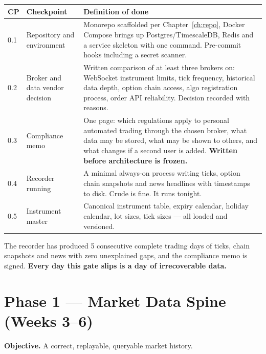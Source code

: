 \begin{longtable}{@{}p{1.4cm}p{6.0cm}p{7.0cm}@{}}
\toprule
\textbf{CP} & \textbf{Checkpoint} & \textbf{Definition of done}\\
\midrule
0.1 & Repository and environment & Monorepo scaffolded per Chapter~\ref{ch:repo},
Docker Compose brings up Postgres/TimescaleDB, Redis and a service skeleton with
one command. Pre-commit hooks including a secret scanner.\\
0.2 & Broker and data vendor decision & Written comparison of at least three
brokers on: WebSocket instrument limits, tick frequency, historical data depth,
option chain access, algo registration process, order API reliability. Decision
recorded with reasons.\\
0.3 & Compliance memo & One page: which regulations apply to personal automated
trading through the chosen broker, what data may be stored, what may be shown to
others, and what changes if a second user is added. \textbf{Written before
architecture is frozen.}\\
0.4 & Recorder running & A minimal always-on process writing ticks, option chain
snapshots and news headlines with timestamps to disk. Crude is fine. It runs
tonight.\\
0.5 & Instrument master & Canonical instrument table, expiry calendar, holiday
calendar, lot sizes, tick sizes --- all loaded and versioned.\\
\bottomrule
\end{longtable}

\begin{gatebox}[title={Gate G0}]
The recorder has produced 5 consecutive complete trading days of ticks, chain
snapshots and news with zero unexplained gaps, and the compliance memo is
signed. \textbf{Every day this gate slips is a day of irrecoverable data.}
\end{gatebox}

\section{Phase 1 --- Market Data Spine (Weeks 3--6)}

\textbf{Objective.} A correct, replayable, queryable market history.

